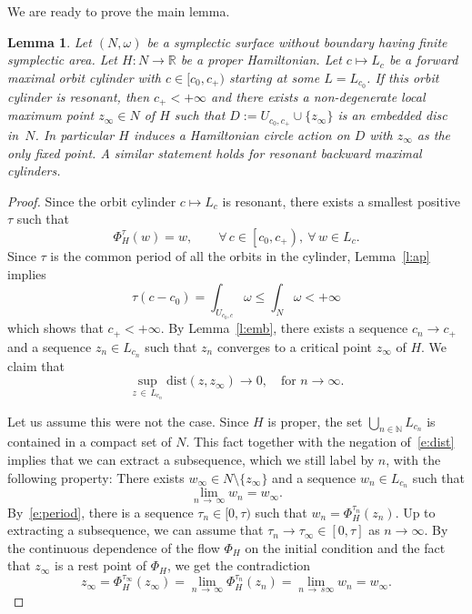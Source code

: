 \documentclass[10pt]{amsart}
\newtheorem{lemm}[cdrthm]{Lemma}
\theoremstyle{definition}
\newcommand{\N}{\mathbb{N}}
\newcommand{\R}{\mathbb{R}}
\newcommand{\dist}{\mathrm{dist}}
\let\oldforall\forall
\renewcommand*{\forall}{\mathrel{\oldforall}}
\begin{document}
We are ready to prove the main lemma.

\begin{lemm}\label{l:main}
Let $(N,\omega)$ be a symplectic surface without boundary having finite symplectic area. Let $H:N\to\R$ be a proper Hamiltonian. Let $c\mapsto L_c$ be a forward maximal orbit cylinder with $c\in[c_0,c_+)$ starting at some $L=L_{c_0}$. If this orbit cylinder is resonant, then $c_+<+\infty$ and there exists a non-degenerate local maximum point $z_\infty\in N$ of $H$ such that $D:=U_{c_0,c_+}\cup\{z_\infty\}$ is an embedded disc in~$N$. In particular $H$ induces a Hamiltonian circle action on $D$ with $z_\infty$ as the only fixed point. A similar statement holds for resonant backward maximal cylinders.
\end{lemm}


\begin{proof}
Since the orbit cylinder $c\mapsto L_c$ is resonant, there exists a smallest positive $\tau$ such that
\begin{equation}\label{e:period}
\Phi^\tau_H(w)=w,\qquad \forall\,c\in\left[c_0,c_+\right),\ \forall\, w\in L_c.
\end{equation}
Since $\tau$ is the common period of all the orbits in the cylinder, Lemma~\ref{l:ap} implies
\[
\tau \left(c-c_0\right)=\int_{U_{c_0,c}}\omega\leq \int_N\omega<+\infty
\]
which shows that $c_+<+\infty$. By Lemma~\ref{l:emb}, there exists a sequence $c_n\to c_+$ and a sequence $z_n\in L_{c_n}$ such that $z_n$ converges to a critical point $z_\infty$ of $H$. We claim that
\begin{equation}\label{e:dist}
\sup_{z\,\in\,L_{c_n}}\dist\left(z,z_\infty\right)\to0,\quad \text{for }n\to\infty.
\end{equation}

Let us assume this were not the case. Since $H$ is proper, the set $\bigcup_{n\in\N}L_{c_n}$ is contained in a compact set of $N$. This fact together with the negation of~\eqref{e:dist} implies that we can extract a subsequence, which we still label by $n$, with the following property: There exists $w_\infty\in N\setminus\{z_\infty\}$ and a sequence $w_n\in L_{c_n}$ such that
\[
\lim_{n\,\to\,\infty}w_n=w_\infty.
\]
By~\eqref{e:period}, there is a sequence $\tau_n\in[0,\tau)$ such that $w_n=\Phi^{\tau_n}_H(z_n)$. Up to extracting a subsequence, we can assume that $\tau_n\to\tau_\infty\in[0,\tau]$ as $n\to\infty$. By the continuous dependence of the flow $\Phi_H$ on the initial condition and the fact that $z_\infty$ is a rest point of $\Phi_H$, we get the contradiction
\[
z_\infty=\Phi^{\tau_\infty}_H(z_\infty)=\lim_{n\,\to\,\infty}\Phi^{\tau_n}_H(z_n)=\lim_{n\,\to\,s\infty}w_n=w_\infty.
\]


\end{proof}
\end{document}
